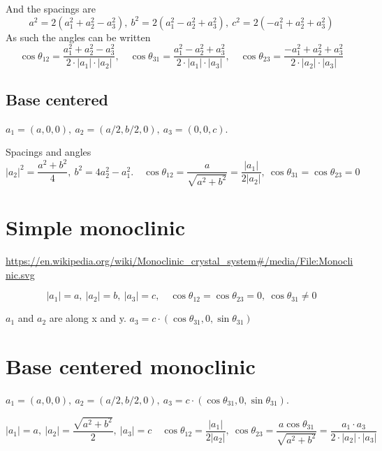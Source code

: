 \documentclass[main.tex]{subfiles}
\begin{document}
	And the spacings are
	\begin{equation}\label{key}
		a^2 = 2 (a_1^2+a_2^2-a_3^2), \ b^2 = 2(a_1^2-a_2^2+a_3^2), \ c^2 = 2(-a_1^2+a_2^2+a_3^2)
	\end{equation}
	As such the angles can be written
	\begin{equation}\label{key}
		\cos \theta_{12} = \frac{a_1^2+a_2^2-a_3^2}{2 \cdot |a_1| \cdot |a_2|}, \quad
		\cos \theta_{31} = \frac{a_1^2-a_2^2+a_3^2}{2 \cdot |a_1| \cdot |a_3|}, \quad
		\cos \theta_{23} = \frac{-a_1^2+a_2^2+a_3^2}{2 \cdot |a_2| \cdot |a_3|}
	\end{equation}
	
	
	\subsection{Base centered}
	$ a_1 = (a,0,0),\ a_2 = (a/2,b/2,0),\ a_3 = (0,0,c) $.
	
	Spacings and angles
	\begin{equation}\label{key}
	|a_2|^2 = \frac{a^2+b^2}{4}, \ b^2 = 4a_2^2-a_1^2. \quad \cos \theta_{12} = \frac{a}{\sqrt{a^2+b^2}} = \frac{|a_1|}{2|a_2|}, \ \cos\theta_{31} = \cos \theta_{23} = 0
	\end{equation}
	
	\section{Simple monoclinic}
	\url{https://en.wikipedia.org/wiki/Monoclinic_crystal_system#/media/File:Monoclinic.svg}

	\begin{equation}\label{key}
		|a_1| = a,\ |a_2| = b,\ |a_3| = c, \quad \cos \theta_{12} = \cos \theta_{23} = 0, \ \cos \theta_{31} \neq 0
	\end{equation}
	
	$a_1$ and $a_2$ are along x and y. $a_3 = c \cdot (\cos \theta_{31},0,\sin \theta_{31})$
	
	\section{Base centered monoclinic}
	$ a_1 = (a,0,0),\ a_2 =(a/2, b/2,0),\ a_3 = c \cdot (\cos \theta_{31},0,\sin \theta_{31}) $.
	
	\begin{equation}\label{key}
	|a_1| = a,\ |a_2| = \frac{\sqrt{a^2+b^2}}{2}, \ |a_3| = c \quad \cos \theta_{12} = \frac{|a_1|}{2|a_2|}, \ \cos \theta_{23} = \frac{a\cos\theta_{31}}{\sqrt{a^2+b^2}} = \frac{a_1 \cdot a_3}{2 \cdot |a_2| \cdot |a_3|}
	\end{equation}
	
\end{document}
